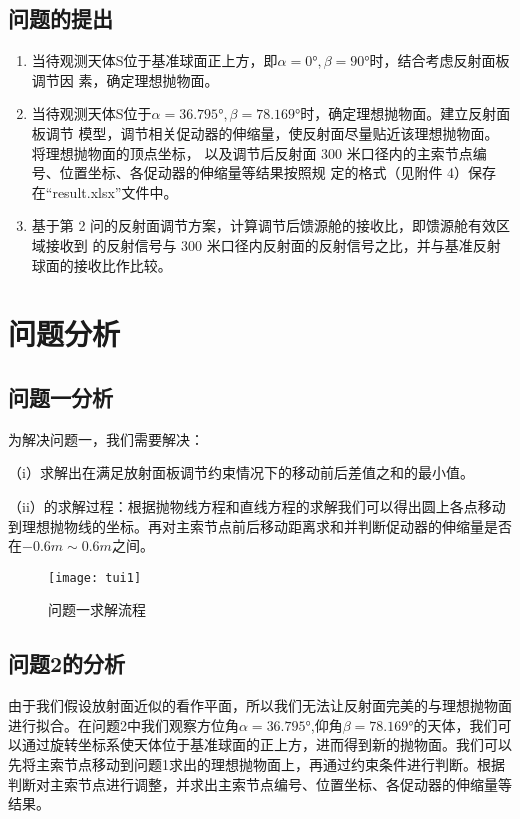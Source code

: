 \documentclass[withoutpreface,bwprint]{cumcmthesis} %
\numberwithin{equation}{subsection}
\begin{document}
\subsection{问题的提出}




\begin{enumerate}[label=(\arabic*)]
\item  当待观测天体S位于基准球面正上方，即$\alpha = 0°, \beta = 90°$时，结合考虑反射面板调节因
素，确定理想抛物面。
	
\item  当待观测天体S位于$\alpha = 36.795°, \beta = 78.169°$时，确定理想抛物面。建立反射面板调节
模型，调节相关促动器的伸缩量，使反射面尽量贴近该理想抛物面。将理想抛物面的顶点坐标，
以及调节后反射面 300 米口径内的主索节点编号、位置坐标、各促动器的伸缩量等结果按照规
定的格式（见附件 4）保存在“result.xlsx”文件中。
	
\item  基于第 2 问的反射面调节方案，计算调节后馈源舱的接收比，即馈源舱有效区域接收到
的反射信号与 300 米口径内反射面的反射信号之比，并与基准反射球面的接收比作比较。
	
\end{enumerate}




\section{问题分析}
\subsection{问题一分析}
为解决问题一，我们需要解决：

（i）求解出在满足放射面板调节约束情况下的移动前后差值之和的最小值。

（ii）的求解过程：根据抛物线方程和直线方程的求解我们可以得出圆上各点移动到理想抛物线的坐标。再对主索节点前后移动距离求和并判断促动器的伸缩量是否在$-0.6m\sim0.6m$之间。


\begin{figure}[!h]
    \centering
    \texttt{[image: tui1]}
    \caption{问题一求解流程}
    \label{fig:1}
\end{figure}


\subsection{问题2的分析}
由于我们假设放射面近似的看作平面，所以我们无法让反射面完美的与理想抛物面进行拟合。在问题2中我们观察方位角$\alpha = 36.795°$,仰角$ \beta = 78.169°$的天体，我们可以通过旋转坐标系使天体位于基准球面的正上方，进而得到新的抛物面。我们可以先将主索节点移动到问题1求出的理想抛物面上，再通过约束条件进行判断。根据判断对主索节点进行调整，并求出主索节点编号、位置坐标、各促动器的伸缩量等结果。
\end{document}
